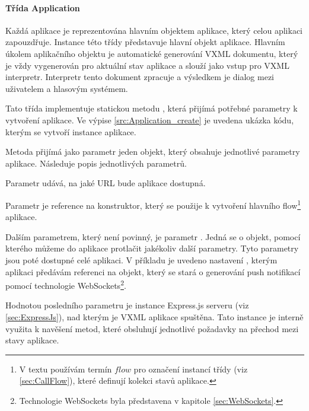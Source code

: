 \documentclass[ing,male,java,dept460]{diploma}						%
\begin{document}


\paragraph{Třída Application}
\label{sec:Application}
Každá aplikace je reprezentována hlavním objektem aplikace, který celou aplikaci zapouzdřuje. Instance této třídy představuje hlavní objekt aplikace. Hlavním úkolem aplikačního objektu je automatické generování VXML dokumentu, který je vždy vygenerován pro aktuální stav aplikace a slouží jako vstup pro VXML interpretr. Interpretr tento dokument zpracuje a výsledkem je dialog mezi uživatelem a hlasovým systémem.

Tato třída implementuje statickou metodu , která přijímá potřebné parametry k vytvoření aplikace. Ve výpise \ref{src:Application_create} je uvedena ukázka kódu, kterým se vytvoří instance aplikace.



Metoda  přijímá jako parametr jeden objekt, který obsahuje jednotlivé parametry aplikace. Následuje popis jednotlivých parametrů.

Parametr  udává, na jaké URL bude aplikace dostupná.

Parametr  je reference na konstruktor, který se použije k vytvoření hlavního flow\footnote{V textu používám termín $flow$ pro označení instancí třídy  (viz \ref{sec:CallFlow}), které definují kolekci stavů aplikace.} aplikace.

Dalším parametrem, který není povinný, je parametr . Jedná se o objekt, pomocí kterého můžeme do aplikace protlačit jakékoliv další parametry. Tyto parametry jsou poté dostupné celé aplikaci. V příkladu je uvedeno nastavení , kterým aplikaci předávám referenci na objekt, který se stará o generování push notifikací pomocí technologie WebSockets\footnote{Technologie WebSockets byla představena v kapitole \ref{sec:WebSockets}.}.

Hodnotou posledního parametru  je instance Express.js serveru (viz \ref{sec:ExpressJs}), nad kterým je VXML aplikace spuštěna. Tato instance je interně využita k navěšení metod, které obsluhují jednotlivé požadavky na přechod mezi stavy aplikace.
\end{document}
